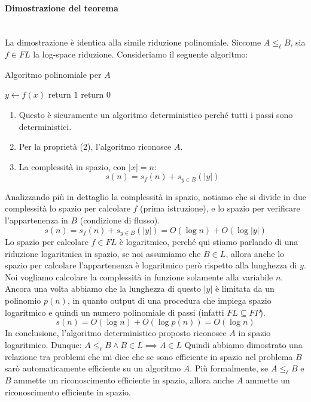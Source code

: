 \documentclass{article}
\begin{document}
\paragraph{Dimostrazione del teorema}\mbox{}\\
La dimostrazione è identica alla simile riduzione polinomiale. Siccome $A\leq_{\ell}B$, sia
$f\in FL$ la log-space riduzione. Consideriamo il seguente algoritmo:
\begin{algorithm}[hbt!]
    \caption{Algoritmo polinomiale per $A$}\label{alg:poly-a}
    $y\leftarrow f(x)$\;
    {
        return $1$\;
    }
    return $0$\;
\end{algorithm}
\begin{enumerate}
    \item Questo è sicuramente un algoritmo deterministico perché tutti i passi
          sono deterministici.
    \item Per la proprietà (2), l'algoritmo riconosce $A$.
    \item La complessità in spazio, con $|x|=n$:
          $$s(n)=s_f(n)+s_{y\in B}(|y|)$$
\end{enumerate}
Analizzando più in dettaglio la complessità in spazio, notiamo che si divide in due
complessità lo spazio per calcolare $f$ (prima istruzione), e lo spazio per verificare
l'appartenenza in $B$ (condizione di flusso).
$$s(n)=s_f(n)+s_{y\in B}(|y|)=O(\log n)+O(\log |y|)$$
Lo spazio per calcolare $f\in FL$ è logaritmico, perché qui stiamo parlando di una riduzione logaritmica
in spazio, se noi assumiamo che $B\in L$, allora anche lo spazio per calcolare l'appartenenza
è logaritmico però rispetto alla lunghezza di $y$. Noi vogliamo calcolare la complessità
in funzione solamente alla variabile $n$.
\newline\newline
Ancora una volta abbiamo che la lunghezza di questo $|y|$ è limitata da un polinomio $p(n)$, in
quanto output di una procedura che impiega spazio logaritmico e quindi un numero polinomiale di
passi (infatti $FL\subseteq FP$).
$$s(n)=O(\log n)+O(\log p(n))=O(\log n)$$
In conclusione, l'algoritmo deterministico proposto riconosce $A$ in spazio logaritmico.
Dunque: $A\leq_{\ell}B\land B\in L\implies A\in L$
Quindi abbiamo dimostrato una relazione tra problemi che mi dice che se sono efficiente in spazio
nel problema $B$ sarò automaticamente efficiente su un algoritmo $A$. Più formalmente, se
$A\leq_{\ell}B$ e $B$ ammette un riconoscimento efficiente in spazio, allora anche $A$ ammette un
riconoscimento efficiente in spazio.
\end{document}
